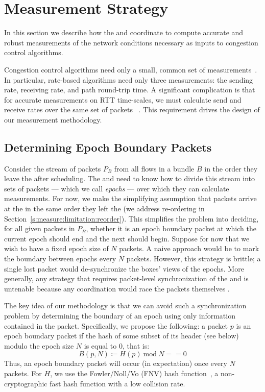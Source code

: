 \section{Measurement Strategy}\label{s:measurement}

In this section we describe how the \inbox and \outbox coordinate to compute accurate and robust
measurements of the network conditions necessary as inputs to congestion control algorithms.

Congestion control algorithms need only a small, common set of measurements~\cite{ccp-hotnets}. 
In particular, rate-based algorithms need only three measurements: 
the sending rate, receiving rate, and path round-trip time.
A significant complication is that for accurate measurements on RTT time-scales, we must calculate send and receive rates over the same set of packets~\cite{packettrain} .
This requirement drives the design of our measurement methodology.

\subsection{Determining Epoch Boundary Packets}
\label{s:measure:marking}
Consider the stream of packets $P_B$ from all flows in a bundle $B$ in the order they leave the \inbox after scheduling.
The \inbox and \outbox need to know how to divide this stream into sets 
of packets --- which we call \emph{epochs} --- over which they can calculate measurements.
For now, we make the simplifying assumption that packets arrive at the \outbox in the same order they 
left the \inbox (we address re-ordering in Section~\ref{s:measure:limitation:reorder}).  
This simplifies the problem into deciding, for all given packets in $P_B$, whether it is an epoch boundary packet at which the current epoch should end and the next should begin. 
Suppose for now that we wish to have a fixed epoch size of $N$ packets.
A naive approach would be to mark the boundary between epochs every $N$ packets. 
However, this strategy is brittle; a single lost packet would de-synchronize the boxes' views of the epochs. 
More generally, any strategy that requires packet-level synchronization of the \inbox and
\outbox is untenable because any coordination would race the packets themselves .

The key idea of our methodology is that we can avoid such a synchronization problem by determining the boundary of an epoch using only information contained in the packet.
Specifically, we propose the following: a packet $p$ is an epoch boundary packet if the hash 
of some subset of its header (see below) modulo the epoch size $N$ is equal to 0, that is:
$$B(p,N) \coloneqq H(p)\ \text{mod}\ N == 0$$
Thus, an epoch boundary packet will occur (in expectation) once every $N$ packets.
For $H$, we use the Fowler/Noll/Vo (FNV) hash function~\cite{fnv-hash}, a non-cryptographic fast hash function with a low collision rate. 


